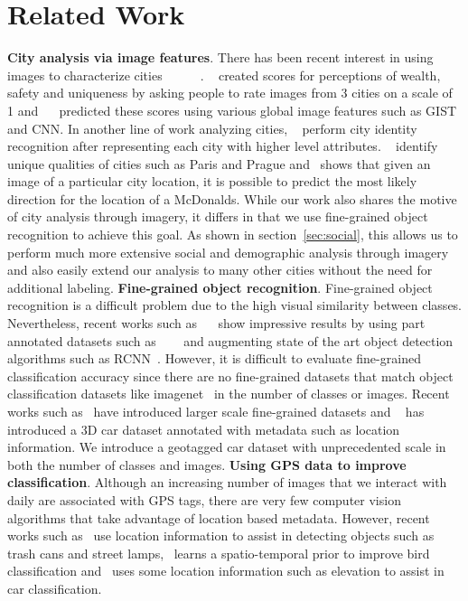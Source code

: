 \documentclass[10pt,twocolumn,letterpaper]{article}
\begin{document}
\section{Related Work}
\textbf{City analysis via image features}. There has been recent interest in using images to characterize cities~\cite{mit_plos_1}~\cite{tamara}~\cite{paris}~\cite{antonio}~\cite{mit_cvpr}~\cite{mcdonalds}. ~\cite{mit_plos_1} created scores for perceptions of wealth, safety and uniqueness by asking people to rate images from 3 cities on a scale of 1 and ~\cite{mit_cvpr}~\cite{tamara} predicted these scores using various global image features such as GIST and CNN. In another line of work analyzing cities, ~\cite{antonio} perform city identity recognition after representing each city with higher level attributes. ~\cite{paris} identify unique qualities of cities such as Paris and Prague and~\cite{mcdonalds} shows that given an image of a particular city location, it is possible to predict the most likely direction for the location of a McDonalds. While our work also shares the motive of city analysis through imagery, it differs in that we use fine-grained object recognition to achieve this goal. As shown in section~\ref{sec:social}, this allows us to perform much more extensive social and demographic analysis through imagery and also easily extend our analysis to many other cities without the need for additional labeling.\newline\newline
\textbf{Fine-grained object recognition}. Fine-grained object recognition is a difficult problem due to the high visual similarity between classes. Nevertheless, recent works such as ~\cite{ning}~\cite{cars} show impressive results by using part annotated datasets such as ~\cite{birds}~\cite{dogs}~\cite{cars} and augmenting state of the art object detection algorithms such as RCNN~\cite{rcnn}. However, it is difficult to evaluate fine-grained classification accuracy since there are no fine-grained datasets that match object classification datasets like imagenet~\cite{imagenet} in the number of classes or images. Recent works such as~\cite{birdsnap} have introduced larger scale fine-grained datasets and ~\cite{nyc3d} has introduced a 3D car dataset annotated with metadata such as location information. We introduce a geotagged car dataset with unprecedented scale in both the number of classes and images.\newline\newline
\textbf{Using GPS data to improve classification}. Although an increasing number of images that we interact with daily are associated with GPS tags, there are very few computer vision algorithms that take advantage of location based metadata. However, recent works such as~\cite{amir} use location information to assist in detecting objects such as trash cans and street lamps,~\cite{birdsnap} learns a spatio-temporal prior to improve bird classification and~\cite{nyc3d} uses some location information such as elevation to assist in car classification. 
\end{document}
